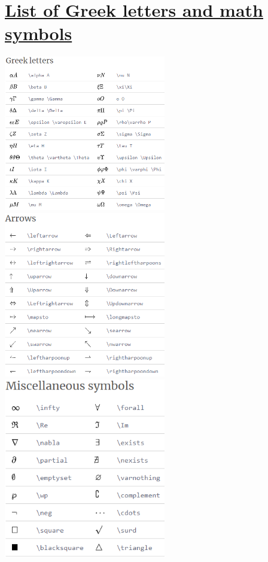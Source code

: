 \documentclass[10 pt]{book}
\begin{document}
\section{\href{https://www.overleaf.com/learn/latex/List_of_Greek_letters_and_math_symbols}{List of Greek letters and math symbols}}
\begin{center}
	\includegraphics[width=200pt]{Greek Letters.png} 
	\includegraphics[width=200pt]{Arrows.png}
	\includegraphics[width=200pt]{Miscellaneous symbols.png}

\end{center}
\end{document}
